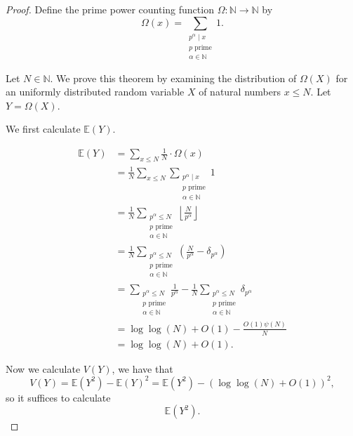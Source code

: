 \documentclass[12pt,reqno]{amsart}
\begin{document}
\begin{proof}
Define the prime power counting function \(\Omega : \mathbb{N} \to \mathbb{N} \) by
\[
    \Omega(x) = \sum _{\substack{ p ^{\alpha} \mid x \\ p \text{ prime} \\ \alpha \in \mathbb{N}  }} 1
.\]

Let \(N \in \mathbb{N} \). We prove this theorem by examining the distribution of \(\Omega(X)\) for an
uniformly distributed random variable \(X\) of natural numbers \(x \leq N\).
Let \(Y = \Omega(X)\).

We first calculate \(\mathbb{E} (Y)\).

\begin{align*}
\mathbb{E} (Y) & = \sum _{x \leq N} \frac{1}{N} \cdot \Omega(x)\\
& = \frac{1}{N} \sum _{x \leq N } \sum _{\substack{ p^{\alpha} \mid x \\ p \text{ prime} \\ \alpha \in \mathbb{N}  }} 1\\
& = \frac{1}{N} \sum _{\substack{ p^{\alpha} \leq N \\ p \text{ prime} \\ \alpha \in \mathbb{N}  }} \left\lfloor \frac{N}{p ^{\alpha}}  \right\rfloor \\
& = \frac{1}{N} \sum _{\substack{ p^{\alpha}\leq N \\ p \text{ prime}  \\ \alpha \in \mathbb{N}   }} \left( \frac{N}{p ^{\alpha}} - \delta_{p ^{\alpha}}  \right)  \\
& = \sum _{\substack{ p^{\alpha}\leq N \\p  \text{ prime} \\ \alpha \in  \mathbb{N}  }} \frac{1}{p ^{\alpha}} - \frac{1}{N} \sum _{\substack{ p ^{\alpha} \leq N \\ p \text{ prime} \\ \alpha \in  \mathbb{N} }}  \delta_{p ^{\alpha}} \\
& = \log\log \left( N \right) + O(1) - \frac{O(1) \psi(N)}{N} \\
& = \log\log \left( N \right) + O(1).
\end{align*}


Now we calculate \(V(Y)\), we have that
\[
    V(Y) = \mathbb{E} (Y^{2}) - \mathbb{E} (Y)^{2} = \mathbb{E} (Y^{2}) - \left( \log\log \left( N \right) + O(1) \right) ^{2}
,\]
so it suffices to calculate
\[
    \mathbb{E} (Y^{2})
.\]


\end{proof}
\end{document}
